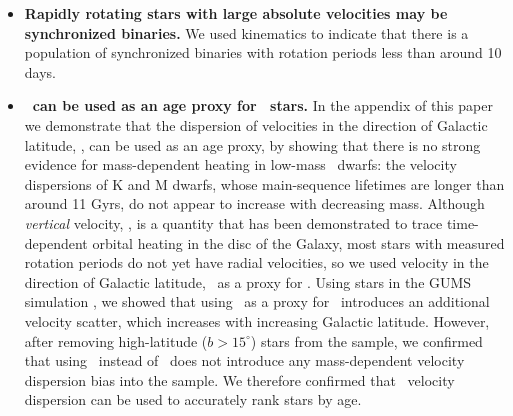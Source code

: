 \begin{itemize}
\item{{\bf Rapidly rotating stars with large absolute velocities may be
synchronized binaries.}
We used kinematics to indicate that there is a population of
synchronized binaries with rotation periods less than around 10 days.}

\item{{\bf \sigmavb\ can be used as an age proxy for \kepler\ stars.} In the
    appendix of this paper we demonstrate that the dispersion of velocities in
        the direction of Galactic latitude, \vb, can be used as an age proxy,
        by showing that there is no strong evidence for mass-dependent heating
        in low-mass \kepler\ dwarfs: the velocity dispersions of K and M
        dwarfs, whose main-sequence lifetimes are longer than around 11 Gyrs,
        do not appear to increase with decreasing mass.
Although {\it vertical} velocity, \vz, is a quantity that has been
demonstrated to trace time-dependent orbital heating in the disc of the
Galaxy, most stars with measured rotation periods do not yet have radial
velocities, so we used velocity in the direction of Galactic latitude, \vb\,
as a proxy for \vz.
        Using stars in the GUMS simulation \citep{robin2012}, we showed that
        using \vb\ as a proxy for \vz\ introduces an additional
        velocity scatter, which increases with increasing Galactic
        latitude.
However, after removing high-latitude ($b>15^\circ$) stars from the sample, we
confirmed that using \vb\ instead of \vz\ does not introduce any
mass-dependent velocity dispersion bias into the sample.
We therefore confirmed that \vb\ velocity dispersion can be used to accurately
rank stars by age.}

\end{itemize}


